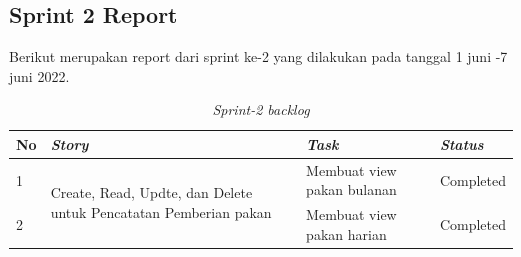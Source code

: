 
\subsection{Sprint 2 Report}
Berikut merupakan report dari sprint ke-2 yang dilakukan pada tanggal 1 juni -7 juni 2022.

\begin{table}[H]
	\caption{\textit{Sprint-2 backlog}}
	\label{sprint2_backlog}
	\begin{tabular}{@{} |p{0.5cm}|p{5cm}|p{5cm}|p{2cm}| @{}}
		\hline
		\textbf{No} & \textbf{\textit{Story}} & \textbf{\textit{Task}} & \textbf{\textit{Status}} \\
		\hline
		1 & \multirow{3}{5cm}{Create, Read, Updte, dan Delete untuk Pencatatan Pemberian pakan} & Membuat view pakan bulanan & Completed\\
		\cline{1-1}\cline{3-4}
		2 & & Membuat view pakan harian & Completed\\
		\cline{1-1}\cline{3-4}
		\hline
	\end{tabular}
\end{table}


